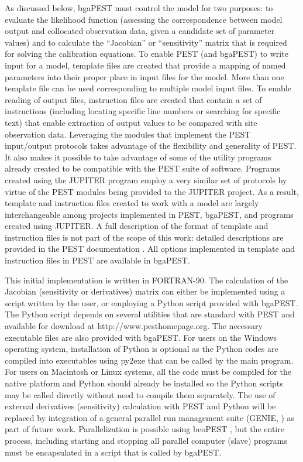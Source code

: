 \documentclass[11pt,oneside,onecolumn]{usgsreport}
\begin{document}
\begin{multicols}{2}
As discussed below, bgaPEST must control the model for two purposes:
to evaluate the likelihood function (assessing the correspondence
between model output and collocated observation data, given a candidate
set of parameter values) and to calculate the ``Jacobian'' or ``sensitivity''
matrix that is required for solving the calibration equations. To
enable PEST (and bgaPEST) to write input for a model, template files
are created that provide a mapping of named parameters into their
proper place in input files for the model. More than one template
file can be used corresponding to multiple model input files. To enable
reading of output files, instruction files are created that contain
a set of instructions (including locating specific line numbers or
searching for specific text) that enable extraction of output values
to be compared with site observation data. Leveraging the modules
that implement the PEST input/output protocols takes advantage of
the flexibility and generality of PEST. It also makes it possible
to take advantage of some of the utility programs already created
to be compatible with the PEST suite of software. Programs created
using the JUPITER program employ a very similar set of protocols by
virtue of the PEST modules being provided to the JUPITER project.
As a result, template and instruction files created to work with a
model are largely interchangeable among projects implemented in PEST,
bgaPEST, and programs created using JUPITER. A full description of
the format of template and instruction files is not part of the scope
of this work: detailed descriptions are provided in the PEST documentation
\citep[chapter 3]{PEST}. All options implemented in template and
instruction files in PEST are available in bgaPEST.

This initial implementation is written in FORTRAN-90. The calculation
of the Jacobian (sensitivity or derivatives) matrix can either be
implemented using a script written by the user, or employing a Python
script provided with bgaPEST. The Python script depends on several
utilities that are standard with PEST and available for download at
http://www.pesthomepage.org. The necessary executable files are also
provided with bgaPEST. For users on the Windows operating system,
installation of Python is optional as the Python codes are compiled
into executables using py2exe that can be called by the main program.
For users on Macintosh or Linux systems, all the code must be compiled
for the native platform and Python should already be installed so
the Python scripts may be called directly without need to compile
them separately. The use of external derivatives (sensitivity) calculation
with PEST and Python will be replaced by integration of a general
parallel run management suite (GENIE, \citet{GENIE}) as part of future
work. Parallelization is possible using beoPEST \citep{beoPEST},
but the entire process, including starting and stopping all parallel
computer (slave) programs must be encapsulated in a script that is
called by bgaPEST. 



\end{multicols}
\end{document}
